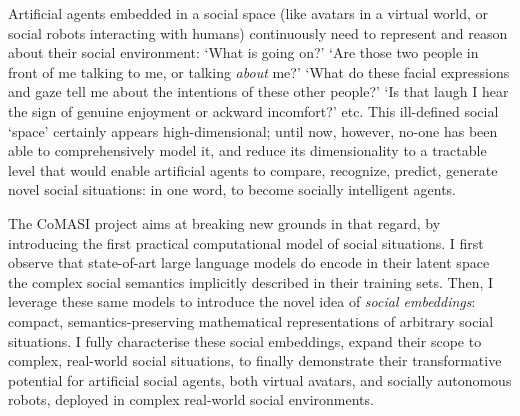 \documentclass[11pt,a4paper]{report}
\newcommand{\project}{CoMASI\xspace}
\begin{document}


Artificial agents embedded in a social space (like avatars in a virtual world,
or social robots interacting with humans) continuously need to represent and
reason about their social environment: `What is going on?' `Are those two people
in front of me talking to me, or talking \emph{about} me?' `What do these facial
expressions and gaze tell me about the intentions of these other people?' `Is
that laugh I hear the sign of genuine enjoyment or ackward incomfort?' etc. This
ill-defined social `space' certainly appears high-dimensional; until now,
however, no-one has been able to comprehensively model it, and reduce its dimensionality
to a tractable level that would enable artificial agents to compare, recognize,
predict, generate novel social situations: in one word, to become socially
intelligent agents.

The \project project aims at breaking new grounds in that regard, by introducing the first
practical computational model of social situations. I first observe that
state-of-art large language models do encode in their latent space the complex
social semantics implicitly described in their training sets. Then, I leverage
these same models to introduce the novel idea of \emph{social embeddings}:
compact, semantics-preserving mathematical representations of arbitrary social
situations. I fully characterise these social embeddings, expand their
scope to complex, real-world social situations, to finally demonstrate their
transformative potential for artificial social agents, both virtual avatars,
and socially autonomous robots, deployed in complex real-world social
environments.
\end{document}
